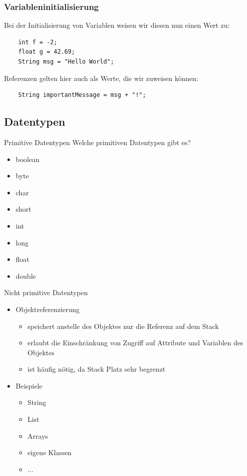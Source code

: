 \begin{frame}[fragile]
\frametitle{Variableninitialisierung}

Bei der Initialisierung von Variablen weisen wir diesen nun einen Wert zu:
\begin{lstlisting}
    int f = -2;
    float g = 42.69;
    String msg = "Hello World";
\end{lstlisting}

Referenzen gelten hier auch als Werte, die wir zuweisen können:
\begin{lstlisting}
    String importantMessage = msg + "!";
\end{lstlisting}
    
\end{frame}

\subsection{Datentypen}

\begin{frame}{Primitive Datentypen}
Welche primitiven Datentypen gibt es?
\begin{itemize}
\item boolean
\item byte
\item char
\item short
\item int
\item long
\item float
\item double
\end{itemize}
\end{frame}

\begin{frame}{Nicht primitive Datentypen}
\begin{itemize}
    \item Objektreferenzierung
    \begin{itemize}
        \item speichert anstelle des Objektes nur die Referenz auf dem Stack
        \item erlaubt die Einschränkung von Zugriff auf Attribute und Variablen des Objektes
        \item ist häufig nötig, da Stack Platz sehr begrenzt
    \end{itemize}
\end{itemize}

\begin{itemize}
    \item Beispiele
    \begin{itemize}
        \item String
        \item List 
        \item Arrays
        \item eigene Klassen
        \item ...
    \end{itemize}
\end{itemize}
\end{frame}

